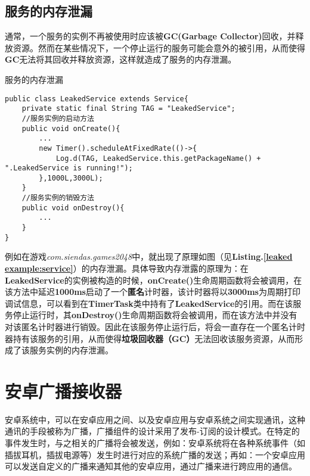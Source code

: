 \subsection{服务的内存泄漏}\label{service_leak}
通常，一个服务的实例不再被使用时应该被\textbf{GC(Garbage Collector)}回收，并释放资源。然而在某些情况下，一个停止运行的服务可能会意外的被引用，从而使得\textbf{GC}无法将其回收并释放资源，这样就造成了服务的内存泄漏。
\begin{listing}[htbp]
	\centering
	\caption{服务的内存泄漏}
	\begin{verbatim}
public class LeakedService extends Service{
	private static final String TAG = "LeakedService";
	//服务实例的启动方法
	public void onCreate(){
		...
		new Timer().scheduleAtFixedRate(()->{
			Log.d(TAG, LeakedService.this.getPackageName() + ".LeakedService is running!");
		},1000L,3000L);
	}
	//服务实例的销毁方法
	public void onDestroy(){
		...
	}
}
	\end{verbatim}
	\label{leaked example:service}
\end{listing}

例如在游戏\emph{com.siendas.games2048}中，就出现了原理如图（见\textbf{Listing.\textcolor{red}{\ref{leaked example:service}}}）的内存泄漏。具体导致内存泄露的原理为：在\textbf{LeakedService}的实例被构造的时候，\textbf{onCreate()}生命周期函数将会被调用，在该方法中延迟\textbf{1000ms}启动了一个\textbf{匿名}计时器，该计时器将以\textbf{3000ms}为周期打印调试信息，可以看到在\textbf{TimerTask}类中持有了\textbf{LeakedService}的引用。而在该服务停止运行时，其\textbf{onDestroy()}生命周期函数将会被调用，而在该方法中并没有对该匿名计时器进行销毁。因此在该服务停止运行后，将会一直存在一个匿名计时器持有该服务的引用，从而使得\textbf{垃圾回收器（GC）}无法回收该服务资源，从而形成了该服务实例的内存泄漏。

\section{安卓广播接收器}\label{broadcast}

安卓系统中，可以在安卓应用之间、以及安卓应用与安卓系统之间实现通讯，这种通讯的手段被称为广播\cite{androidbroadcastsguide}，广播组件的设计采用了发布-订阅的设计模式。在特定的事件发生时，与之相关的广播将会被发送，例如：安卓系统将在各种系统事件（如插拔耳机，插拔电源等）发生时进行对应的系统广播的发送；再如：一个安卓应用可以发送自定义的广播来通知其他的安卓应用，通过广播来进行跨应用的通信。


